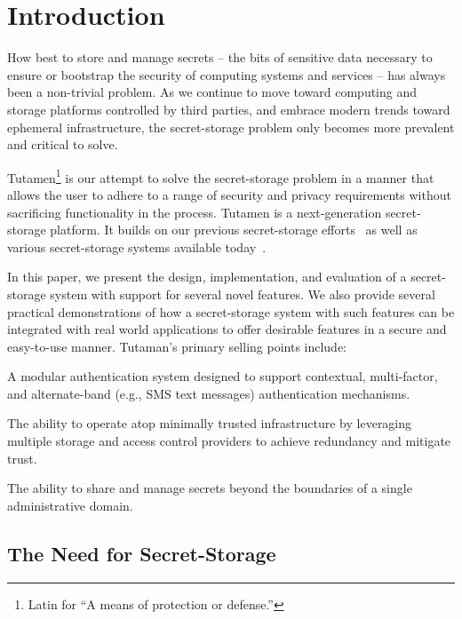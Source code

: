 \section{Introduction}
\label{sec:intro}

How best to store and manage secrets -- the bits of sensitive data
necessary to ensure or bootstrap the security of computing systems and
services -- has always been a non-trivial problem. As we continue to
move toward computing and storage platforms controlled by third
parties, and embrace modern trends toward ephemeral infrastructure,
the secret-storage problem only becomes more prevalent and critical to
solve.

Tutamen\footnote{Latin for ``A means of protection or defense.''} is
our attempt to solve the secret-storage problem in a manner that
allows the user to adhere to a range of security and privacy
requirements without sacrificing functionality in the process. Tutamen
is a next-generation secret-storage platform. It builds on our
previous secret-storage efforts~\cite{custos-trios} as well as various
secret-storage systems available today~\cite{vault, confidant,
  keywhiz}.

In this paper, we present the design, implementation, and evaluation
of a secret-storage system with support for several novel features. We
also provide several practical demonstrations of how a secret-storage
system with such features can be integrated with real world
applications to offer desirable features in a secure and easy-to-use
manner. Tutaman's primary selling points include:
\begin{packed_item}
\item A modular authentication system designed to support contextual,
  multi-factor, and alternate-band (e.g., SMS text messages)
  authentication mechanisms.
\item The ability to operate atop minimally trusted infrastructure by
  leveraging multiple storage and access control providers to achieve
  redundancy and mitigate trust.
\item The ability to share and manage secrets beyond the boundaries
  of a single administrative domain.
\end{packed_item}

\subsection{The Need for Secret-Storage}

